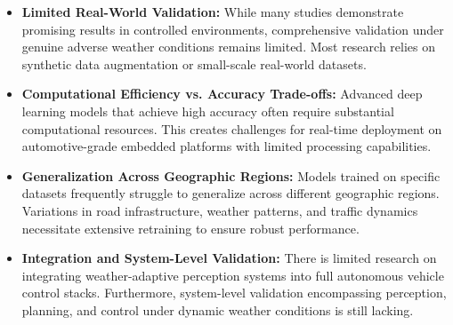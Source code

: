 \begin{itemize}
    \item \textbf{Limited Real-World Validation:} 
    While many studies demonstrate promising results in controlled environments, comprehensive validation under genuine adverse weather conditions remains limited. Most research relies on synthetic data augmentation or small-scale real-world datasets.
    
    \item \textbf{Computational Efficiency vs. Accuracy Trade-offs:} 
    Advanced deep learning models that achieve high accuracy often require substantial computational resources. This creates challenges for real-time deployment on automotive-grade embedded platforms with limited processing capabilities.
    
    \item \textbf{Generalization Across Geographic Regions:} 
    Models trained on specific datasets frequently struggle to generalize across different geographic regions. Variations in road infrastructure, weather patterns, and traffic dynamics necessitate extensive retraining to ensure robust performance.
    
    \item \textbf{Integration and System-Level Validation:} 
    There is limited research on integrating weather-adaptive perception systems into full autonomous vehicle control stacks. Furthermore, system-level validation encompassing perception, planning, and control under dynamic weather conditions is still lacking.
\end{itemize}

